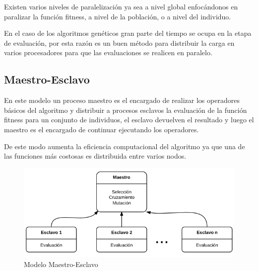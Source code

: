 Existen varios niveles de paralelización ya sea a nivel global enfocándonos en paralizar la función fitness, a nivel de la población, o a nivel del individuo. \citep{Nesmachnow2002}

En el caso de los algoritmos genéticos gran parte del tiempo se ocupa en la etapa de evaluación, por esta razón es un buen método para distribuir la carga en varios procesadores para que las evaluaciones se realicen en paralelo.


\subsection{Maestro-Esclavo}

En este modelo un proceso maestro es el encargado de realizar los operadores básicos del algoritmo y distribuir a procesos esclavos la evaluación de la función fitness para un conjunto de individuos, el esclavo devuelven el resultado y luego el maestro es el encargado de continuar ejecutando los operadores.

De este modo aumenta la eficiencia computacional del algoritmo ya que una de las funciones más costosas es distribuida entre varios nodos.

\begin{figure}[H]
\centering
\includegraphics[width=0.7\linewidth]{Figures/diagrama-master-slave}
\caption[Modelo Maestro-Esclavo]{Modelo Maestro-Esclavo}
\label{fig:diagrama-master-slave}
\end{figure}

